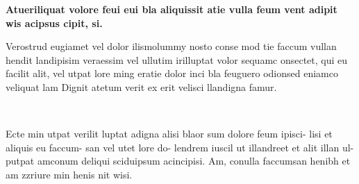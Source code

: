 \documentclass[a4paper,bcor=0mm,9pt,parskip=full,twoside]{tubsartcl}
\begin{document}
\begin{gaussbox}{1}{1}{5}{1}
{\LARGE\sffamily\bfseries Atueriliquat volore feui eui bla
aliquissit atie vulla feum vent
adipit wis acipsus cipit, si.\par}
\end{gaussbox}
\begin{gaussbox}{2}{2}{5}{1}
\mdseries
Verostrud eugiamet vel dolor ilismolummy nosto conse mod tie
faccum vullan hendit landipisim veraessim vel ullutim irilluptat volor
sequamc onsectet, qui eu facilit alit, vel utpat lore ming eratie dolor
inci bla feuguero odionsed eniamco veliquat lam Dignit atetum verit
ex erit velisci llandigna famur.
\end{gaussbox}
\begin{gaussbox}[bgcolor=tuGray20]{1}{3}{5}{6}
\lipsum[2]\par
\lipsum[2]\par
\end{gaussbox}
\clearpage~\clearpage

\begin{gaussbox}[]{1}{1}{1}{1}
\scriptsize\bfseries\raggedright
Ecte min utpat verilit
luptat adigna alisi blaor
sum dolore feum ipisci-
lisi et aliquis eu faccum-
san vel utet lore do-
lendrem iuscil ut
illandreet et alit illan ul-
putpat amconum deliqui
sciduipsum acincipisi.
Am, conulla faccumsan
henibh et am zzriure
min henis nit wisi.
\end{gaussbox}
\begin{gaussbox}[bgcolor=tubsGray20]{2}{1}{3}{1}
\end{gaussbox}
\begin{gaussbox}[bgcolor=tubsGray20]{5}{1}{2}{1}
\end{gaussbox}
\begin{gaussbox}[bgcolor=tubsGray20]{2}{2}{5}{2}
\end{gaussbox}
\begin{gaussbox}{2}{4}{5}{2}
\raggedright\sffamily
\lipsum[1]
\end{gaussbox}
\clearpage
\end{document}
